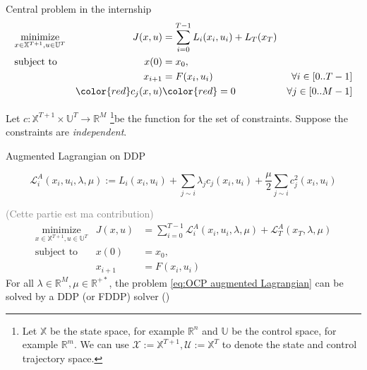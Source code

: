 \documentclass{beamer}
\begin{document}
\begin{frame}{Central problem in the internship}
\begin{equation}
\label{eq:OCP equality constraints}
\begin{aligned}
&\underset{x \in \mathbb{X}^{T+1}, u \in \mathbb{U}^T}{\text{minimize}}          &J(x, u) &=\sum_{i = 0}^{T-1} L_i(x_i, u_i) + L_T(x_T) & \\
&\text{subject to}       &x(0)      &= x_0,  & \\ %
&				  &x_{i+1}  &= F(x_i, u_i)  &\forall i \in [0 .. T-1] \\
&	&\color{red} c_j(x, u) &\color{red} = 0 &\forall j \in [0 .. M-1]
\end{aligned}
\end{equation}

Let $c : \mathbb{X}^{T+1} \times \mathbb{U}^T \rightarrow \mathbb{R}^M$ \footnote{Let $\mathbb{X}$ be the state space, for example $\mathbb{R}^n$ and $\mathbb{U}$ be the control space, for example $\mathbb{R}^m$. We can use $\mathcal{X} := \mathbb{X}^{T+1}, \mathcal{U}:= \mathbb{X}^T$ to denote the state and control trajectory space.}be the function for the set of constraints.
Suppose the constraints are \emph{independent}. 
\end{frame}
\begin{frame}{Augmented Lagrangian on DDP}
\begin{tcolorbox}
\begin{equation}
\mathcal{L}^A_i(x_i, u_i, \lambda, \mu) := L_i(x_i, u_i) 
+ \sum_{j \sim i}\lambda_j c_j(x_i, u_i) + \frac{\mu}{2} \sum_{j \sim i} c_j^2(x_i, u_i) 
\end{equation}
\end{tcolorbox}
\textcolor{gray}{(Cette partie est ma contribution)}
\begin{equation}
\label{eq:OCP augmented Lagrangian}
\begin{aligned}
&\underset{x \in \mathbb{X}^{T+1}, u \in \mathbb{U}^T}{\text{minimize}}          &J(x, u) &=\sum_{i = 0}^{T-1} \mathcal{L}^A_i(x_i, u_i, \lambda, \mu) + \mathcal{L}^A_T(x_T, \lambda, \mu) & \\
&\text{subject to}       &x(0)      &= x_0,  & \\ %
&				  &x_{i+1}  &= F(x_i, u_i)  %
\end{aligned}
\end{equation}
For all $\lambda \in \mathbb{R}^M, \mu \in \mathbb{R}^{+*}$, the problem  \ref{eq:OCP augmented Lagrangian} can be solved by a DDP (or FDDP) solver (\cite{crocoddyl})
\end{frame}
\end{document}
